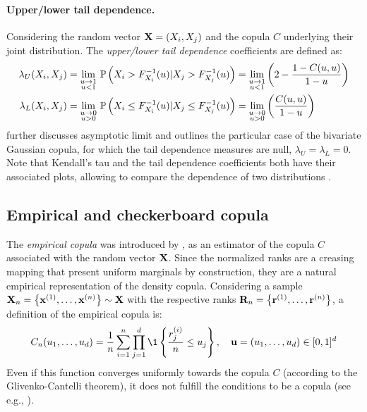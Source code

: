 \paragraph{Upper/lower tail dependence.} Considering the random vector $\bX = (X_i, X_j)$ and the copula $C$ underlying their joint distribution. 
The \textit{upper/lower tail dependence} coefficients are defined as: 
\begin{subequations}
    \begin{align}
        \lambda_U(X_i, X_j) &= \lim_{\substack{u \rightarrow 1 \\ u<1}} \, \P\left(X_i > F_{X_i}^{-1}(u) | X_j > F_{X_j}^{-1}(u)\right) =       \lim_{\substack{u \rightarrow 1 \\ u<1}} \left(2 - \frac{1 - C(u, u)}{1 - u}\right)\\
        \lambda_L(X_i, X_j) &= \lim_{\substack{u \rightarrow 0 \\ u>0}} \, \P\left(X_i \leq F_{X_i}^{-1}(u) | X_j \leq F_{X_j}^{-1}(u)\right) = \lim_{\substack{u \rightarrow 0 \\ u>0}} \left(\frac{C(u, u)}{1 - u}\right) 
    \end{align}
\end{subequations}
\cite{joe_2014} further discusses asymptotic limit and outlines the particular case of the bivariate Gaussian copula, for which the tail dependence measures are null, $\lambda_U = \lambda_L = 0$.
Note that Kendall's tau and the tail dependence coefficients both have their associated plots, allowing to compare the dependence of two distributions .

\subsection{Empirical and checkerboard copula}

The \textit{empirical copula} was introduced by \citet{deheuvels_1979_empirical_copula}, as an estimator of the copula $C$ associated with the random vector $\bX$. 
Since the normalized ranks are a creasing mapping that present uniform marginals by construction, they are a natural empirical representation of the density copula. 
Considering a sample $\bX_n = \left\{\bx^{(1)}, \dots, \bx^{(n)}\right\} \sim \bX$ with the respective ranks $\bR_n = \left\{\br^{(1)}, \dots, \br^{(n)}\right\}$, a definition of the empirical copula is: 
\begin{equation}
    C_n(u_1, \dots, u_d) = \frac1n \sum_{i=1}^{n} \prod_{j=1}^{d} \1 \left\{ \frac{r_j^{(i)}}{n} \leq u_j \right\}, \quad  \bu = (u_1, \dots, u_d) \in [0, 1]^d
    \label{eq:empirical_copula}
\end{equation}
Even if this function converges uniformly towards the copula $C$ (according to the Glivenko-Cantelli theorem), it does not fulfill the conditions to be a copula (see e.g., \citealt{gonzalez_2021_checkerboard_copula}). 

